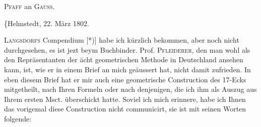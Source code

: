 \NoSourceHead
{}
\begin{center}\large\textsc{Pfaff} an \textsc{Gauss}.\end{center}
\begin{flushright}\{Helmstedt, 22. März 1802.\end{flushright}
\noindent{}\par
\noindent\hspace*{\parindent}\textsc{Langsdorfs} Compendium [*)] habe ich kürzlich bekommen,
aber noch nicht durchgesehen, es ist jezt beym Buchbinder. Prof. \textsc{Pfleiderer}, den man
wohl als den Repräsentanten der ächt geometrischen Methode in Deutschland ansehen kann,
ist, wie er in einem Brief an mich geäussert hat, nicht damit zufrieden. In eben diesem Brief
hat er mir auch eine geometrische Construction des 17-Ecks mitgetheilt, nach Ihren Formeln
oder nach denjenigen, die ich ihm als Auszug aus Ihrem ersten Msct. überschickt hatte.
Soviel ich mich erinnere, habe ich Ihnen das vorigemal diese Construction nicht communicirt,
sie ist mit seinen Worten folgende:

